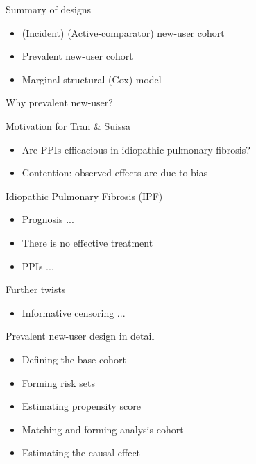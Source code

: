 \documentclass[aspectratio=169,12pt]{beamer} %
\begin{document}

\begin{frame}{Summary of designs}
	\begin{itemize}
		\item (Incident) (Active-comparator) new-user cohort
		\item Prevalent new-user cohort
		\item Marginal structural (Cox) model
	\end{itemize}
\end{frame}

\begin{frame}{Why prevalent new-user?}
\end{frame}

\begin{frame}{Motivation for Tran \& Suissa}
    \begin{itemize}
	\item Are PPIs efficacious in idiopathic pulmonary fibrosis?
	\item Contention: observed effects are due to bias
    \end{itemize}
\end{frame}

\begin{frame}{Idiopathic Pulmonary Fibrosis (IPF)}
    \begin{itemize}
	\item Prognosis ...
	\item There is no effective treatment
	\item PPIs ...
    \end{itemize}
\end{frame}

\begin{frame}{Further twists}
    \begin{itemize}
	\item Informative censoring ...
    \end{itemize}
\end{frame}

\begin{frame}{Prevalent new-user design in detail}
    \begin{itemize}
	\item Defining the base cohort
	\item Forming risk sets
	\item Estimating propensity score
	\item Matching and forming analysis cohort
	\item Estimating the causal effect
    \end{itemize}
\end{frame}
\end{document}
